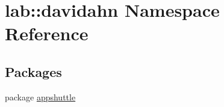 \hypertarget{namespacelab_1_1davidahn}{\section{lab\-:\-:davidahn \-Namespace \-Reference}
\label{namespacelab_1_1davidahn}
}
\subsection*{\-Packages}
\begin{DoxyCompactItemize}
\item 
package \hyperlink{namespacelab_1_1davidahn_1_1appshuttle}{appshuttle}
\end{DoxyCompactItemize}

